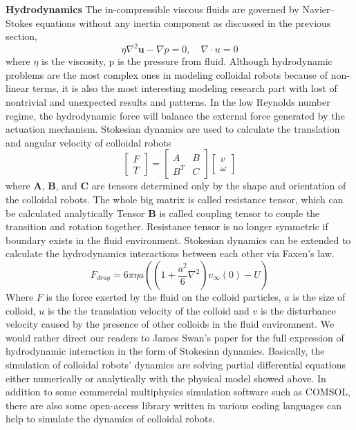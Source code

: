 \textbf{Hydrodynamics}  The in-compressible viscous fluids are governed by Navier–Stokes equations without any inertia component as discussed in the previous section,
\begin{equation}
    \eta \nabla^2\textbf{u}-\nabla p=0,\quad \nabla \cdot u=0
\end{equation}
where $\eta$ is the viscosity, p is the pressure from fluid. Although hydrodynamic problems are the most complex ones in modeling colloidal robots because of non-linear terms, it is also the most interesting modeling research part with lost of  nontrivial and unexpected results and patterns. \autocite{Lauga2009,berke2008hydrodynamic,lauga2011life} In the low Reynolds number regime, the hydrodynamic force will balance the external force generated by the actuation mechanism. Stokesian dynamics are used to calculate the  translation and angular velocity of colloidal robots \autocite{Brady1988a,Kim2005}
\begin{equation}
    \left[ \begin{array}{c} F \\ T \end{array} \right] = \begin{bmatrix} A & B \\ B^T & C \end{bmatrix} \left[ \begin{array}{c} v \\ \omega \end{array} \right]
\end{equation}
where \textbf{A}, \textbf{B}, and \textbf{C} are tensors determined only by the shape and orientation of the colloidal robots. The whole big matrix is called resistance tensor, which can be calculated analytically\autocite{Kim2005}  Tensor \textbf{B} is called coupling tensor to couple the transition and rotation together. Resistance tensor is no longer symmetric if boundary exists in the fluid environment.  Stokesian dynamics  can be extended to calculate the hydrodynamics interactions between each other via Faxen's law.
\begin{equation}
    F_{drag}=6 \pi \eta a((1+\frac{a^2}{6}\nabla^2)v_{\infty}(0)-U)
\end{equation}
Where $F$ is the   force exerted by the fluid on the colloid particles, $a$ is the size of colloid, $u$ is the  the translation  velocity of the colloid and $v$ is the disturbance velocity caused by the presence of other colloids in the fluid environment. We would rather direct our readers to James Swan's paper for the full expression of hydrodynamic interaction in the form of Stokesian dynamics. \autocite{swan2011modeling} Basically, the simulation of colloidal robots' dynamics are solving partial differential equations either numerically or analytically with the physical model showed above. In addition to some commercial multiphysics simulation software such as COMSOL\textregistered, there are also some open-access library written in various coding languages  can help to simulate the dynamics of colloidal robots. \autocite{glaser2015strong,anderson2008general,swan2011modeling,singh2019hydrodynamic}

